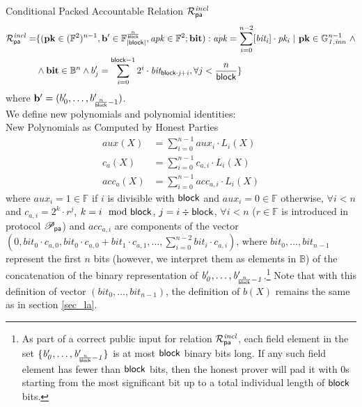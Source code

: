 \noindent \textsf{Conditional Packed Accountable Relation $\mathcal{R}^{\mathit{incl}}_{\mathsf{pa}}$} 
\begin{equation*}
\begin{split}
\mathcal{R}^{\mathit{incl}}_{\mathsf{pa}} = & \{(\mathbf{pk} \in (\mathbb{F}^2)^{n-1},\mathbf{b'} \in \mathbb{F}_{|\mathsf{block}|}^{\frac{n}{\mathsf{block}}},
\mathit{apk} \in \mathbb{F}^2; \mathbf{bit}) : \mathit{apk} = \sum_{i=0}^{n-2} [\mathit{bit_i}] \cdot \mathit{pk_i} \ | \ \mathbf{pk} \in \mathbb{G}_{\mathit{1,inn}}^{n-1} \ \wedge \\
 & \wedge \mathbf{bit} \in \mathbb{B}^n  \wedge b'_{j} = \sum_{i=0}^{\mathsf{block} -1}2^i \cdot \mathit{bit_{\mathsf{block} \cdot j + i}}, \forall j < \frac{n}{\mathsf{block}} \} 
\end{split}
\end{equation*}
where $\mathbf{b'} = (b'_{0}, \ldots, b'_{{\frac{n}{\mathsf{block}}} -1})$. \\
\noindent We define new polynomials and polynomial identities: \\

\noindent \textsf{New Polynomials as Computed by Honest Parties} 
\begin{align*}
aux(X) &= \sum_{i=0}^{n-1}aux_i \cdot L_i(X) \\
c_{a}(X) & = \sum_{i=0}^{n-1} c_{a,i} \cdot L_i(X) \\
acc_{a}(X) & =  \sum_{i=0}^{n-1} acc_{a,i}  \cdot L_i(X)
\end{align*}
\noindent where $aux_{i} = 1 \in \mathbb{F}$ if $i$ is divisible with $\mathsf{block}$ and $aux_{i} = 0 \in \mathbb{F}$ otherwise, $\forall i < n$ \\
\noindent and $c_{a,i} = 2^k \cdot r^j$, $k = i \mod {\mathsf{block}}$, $j = i \div \mathsf{block}$, $\forall i < n$ ($r \in \mathbb{F}$ is introduced in protocol $\mathscr{P}_{\mathsf{pa}}$) and $acc_{a,i}$ are components of the vector $(0, \mathit{bit}_0 \cdot c_{a,0}, \mathit{bit}_0 \cdot c_{a,0}+ \mathit{bit}_1  \cdot c_{a,1}, \ldots, \sum_{i=0}^{n-2}\mathit{bit}_i \cdot c_{a,i})$, where $\mathit{bit_{0}}, \ldots, \mathit{bit_{n-1}}$ represent the first $n$ 
bits (however, we interpret them as elements in $\mathbb{B}$) of the concatenation of the binary representation of 
$\mathit{b'_{0}}, \ldots, \mathit{b'_{\frac{n}{\mathsf{block}}-1}}$.\footnote{As 
part of a correct public input for relation $\mathcal{R}^{\mathit{incl}}_{\mathsf{pa}}$, each field element in the set 
$\{\mathit{b'_{0}}, \ldots, \mathit{b'_{\frac{n}{\mathsf{block}}-1}} \}$ is at most $\mathsf{block}$ binary bits long. If any such field element has fewer than $\mathsf{block}$ bits, 
then the honest prover will pad it with $0$s starting from the most significant bit up to a total individual length of $\mathsf{block}$ bits.} 
Note that with this definition of vector $(\mathit{bit_{0}}, \ldots, \mathit{bit_{n-1}})$, 
the definition of $b(X)$ remains the same as in section \ref{sec_la}.\\

